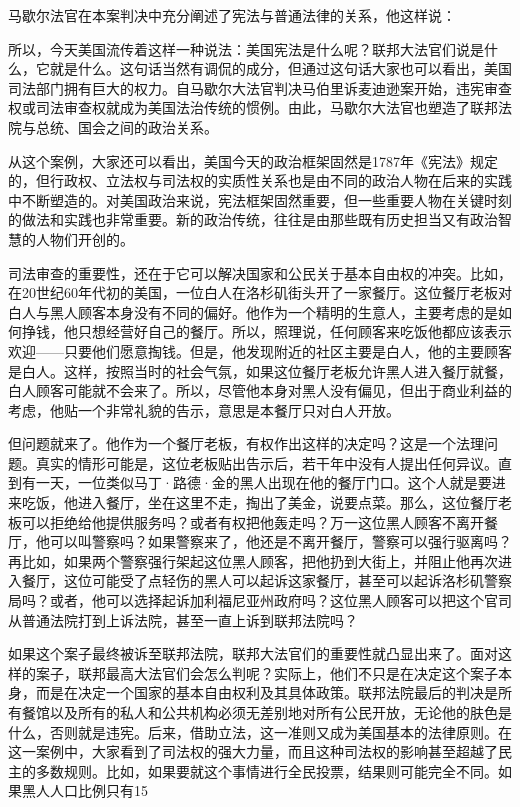 马歇尔法官在本案判决中充分阐述了宪法与普通法律的关系，他这样说：


所以，今天美国流传着这样一种说法：美国宪法是什么呢？联邦大法官们说是什么，它就是什么。这句话当然有调侃的成分，但通过这句话大家也可以看出，美国司法部门拥有巨大的权力。自马歇尔大法官判决马伯里诉麦迪逊案开始，违宪审查权或司法审查权就成为美国法治传统的惯例。由此，马歇尔大法官也塑造了联邦法院与总统、国会之间的政治关系。

从这个案例，大家还可以看出，美国今天的政治框架固然是1787年《宪法》规定的，但行政权、立法权与司法权的实质性关系也是由不同的政治人物在后来的实践中不断塑造的。对美国政治来说，宪法框架固然重要，但一些重要人物在关键时刻的做法和实践也非常重要。新的政治传统，往往是由那些既有历史担当又有政治智慧的人物们开创的。

司法审查的重要性，还在于它可以解决国家和公民关于基本自由权的冲突。比如，在20世纪60年代初的美国，一位白人在洛杉矶街头开了一家餐厅。这位餐厅老板对白人与黑人顾客本身没有不同的偏好。他作为一个精明的生意人，主要考虑的是如何挣钱，他只想经营好自己的餐厅。所以，照理说，任何顾客来吃饭他都应该表示欢迎——只要他们愿意掏钱。但是，他发现附近的社区主要是白人，他的主要顾客是白人。这样，按照当时的社会气氛，如果这位餐厅老板允许黑人进入餐厅就餐，白人顾客可能就不会来了。所以，尽管他本身对黑人没有偏见，但出于商业利益的考虑，他贴一个非常礼貌的告示，意思是本餐厅只对白人开放。

但问题就来了。他作为一个餐厅老板，有权作出这样的决定吗？这是一个法理问题。真实的情形可能是，这位老板贴出告示后，若干年中没有人提出任何异议。直到有一天，一位类似马丁·路德·金的黑人出现在他的餐厅门口。这个人就是要进来吃饭，他进入餐厅，坐在这里不走，掏出了美金，说要点菜。那么，这位餐厅老板可以拒绝给他提供服务吗？或者有权把他轰走吗？万一这位黑人顾客不离开餐厅，他可以叫警察吗？如果警察来了，他还是不离开餐厅，警察可以强行驱离吗？再比如，如果两个警察强行架起这位黑人顾客，把他扔到大街上，并阻止他再次进入餐厅，这位可能受了点轻伤的黑人可以起诉这家餐厅，甚至可以起诉洛杉矶警察局吗？或者，他可以选择起诉加利福尼亚州政府吗？这位黑人顾客可以把这个官司从普通法院打到上诉法院，甚至一直上诉到联邦法院吗？

如果这个案子最终被诉至联邦法院，联邦大法官们的重要性就凸显出来了。面对这样的案子，联邦最高大法官们会怎么判呢？实际上，他们不只是在决定这个案子本身，而是在决定一个国家的基本自由权利及其具体政策。联邦法院最后的判决是所有餐馆以及所有的私人和公共机构必须无差别地对所有公民开放，无论他的肤色是什么，否则就是违宪。后来，借助立法，这一准则又成为美国基本的法律原则。在这一案例中，大家看到了司法权的强大力量，而且这种司法权的影响甚至超越了民主的多数规则。比如，如果要就这个事情进行全民投票，结果则可能完全不同。如果黑人人口比例只有15%


